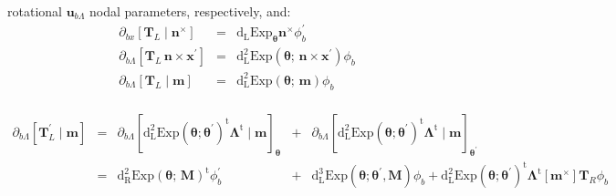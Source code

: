   rotational \(\bm{u}_{b \scriptscriptstyle{\Lambda}}\) nodal
  parameters, respectively, and: %
\begin{equation*} 
   \begin{array}{lllll}
   \partial_{b x}[\mathbf{T}_{\scriptscriptstyle{L}} \mid \bm{n}^\times]
   &=& \operatorname{d_{\scriptscriptstyle{L}}Exp}_{\bm{\theta}}  \bm{n}^\times  \phi_b^{\prime}
   \\
   \partial_{b \scriptscriptstyle{\Lambda}} [\mathbf{T}_{\scriptscriptstyle{L}} \,\bm{n}\times\bm{x}^{\prime}]
   &=&
      \operatorname{d^2_{\scriptscriptstyle{L}}Exp}\left(\bm{\theta};\, \bm{n} \times \bm{x}^{\prime}\right) \phi_b
   \\
   \partial_{b \scriptscriptstyle{\Lambda}}  \left[\mathbf{T}_{\scriptscriptstyle{L}}\mid\bm{m}\right] 
   &=&
       \operatorname{d^2_{\scriptscriptstyle{L}}Exp}\left(\bm{\theta};\, \bm{m}\right) \phi_b \\

   \end{array}
\end{equation*}

\begin{equation*}
   \begin{array}{lllll}
   \partial_{b \scriptscriptstyle{\Lambda}}  \left[\mathbf{T}_{\scriptscriptstyle{L}}^\prime \mid \bm{m}\right]
   &=& \partial_{b \scriptscriptstyle{\Lambda}}  \left[\operatorname{d^2_{\scriptscriptstyle{L}}Exp}(\bm{\theta}; \bm{\theta}^\prime)^{\mathrm{t}}\bm{\Lambda}^{\mathrm{t}}\mid\bm{m}\right]_{\bm{\theta}}
   &+& \partial_{b \scriptscriptstyle{\Lambda}}  \left[\operatorname{d^2_{\scriptscriptstyle{L}}Exp}(\bm{\theta}; \bm{\theta}^\prime)^{\mathrm{t}}\bm{\Lambda}^{\mathrm{t}}\mid\bm{m}\right]_{\bm{\theta}^{\prime}}
   \\
   &=& \operatorname{d^2_{\scriptscriptstyle{R}}Exp}(\bm{\theta};\, \bm{M})^{\mathrm{t}} \phi_b^\prime 
   &+& \operatorname{d^3_{\scriptscriptstyle{L}}Exp}(\bm{\theta}; \bm{\theta}^{\prime},\bm{M}) \phi_b
       +  \operatorname{d^2_{\scriptscriptstyle{L}}Exp}(\bm{\theta}; \bm{\theta}^\prime)^{\mathrm{t}}\bm{\Lambda}^{\mathrm{t}} [\bm{m}^\times] \mathbf{T}_{\scriptscriptstyle{R}} \phi_b
   \end{array}
\end{equation*}
 

